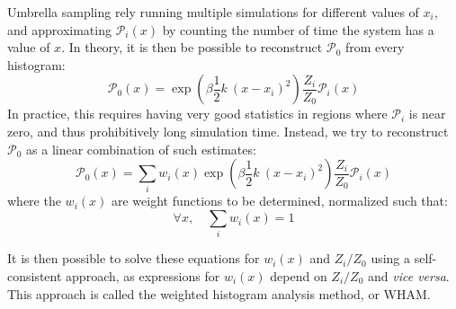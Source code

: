 \documentclass[thesis]{subfiles}
\begin{document}
Umbrella sampling rely running multiple simulations for different values of
$x_i$, and approximating $\mathcal{P}_i(x)$ by counting the number of time the
system has a value of $x$. In theory, it is then be possible to reconstruct
$\mathcal{P}_0$ from every histogram:
\[ \mathcal{P}_0(x) = \exp\left(\beta \frac 12 k\ (x - x_i)^2\right) \frac{Z_i}{Z_0} \mathcal{P}_i(x) \]
In practice, this requires having very good statistics in regions where
$\mathcal{P}_i$ is near zero, and thus prohibitively long simulation time.
Instead, we try to reconstruct $\mathcal{P}_0$ as a linear combination of such
estimates:
\[ \mathcal{P}_0(x) = \sum_i w_i(x) \exp\left(\beta \frac 12 k\ (x - x_i)^2\right) \frac{Z_i}{Z_0} \mathcal{P}_i(x) \]
where the $w_i(x)$ are weight functions to be determined, normalized such that:
\[ \forall x, \quad \sum_i w_i(x) = 1\]

It is then possible to solve these equations for $w_i(x)$ and $Z_i/Z_0$ using a
self-consistent approach, as expressions for $w_i(x)$ depend on $Z_i/Z_0$ and
\emph{vice versa}. This approach is called the weighted histogram analysis
method, or WHAM.

%
%
%
%


\OnlyInSubfile{\printbibliography}
\end{document}
